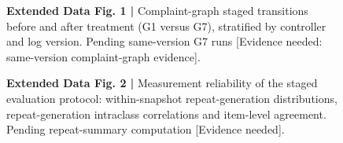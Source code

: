 \documentclass[sn-nature,pdflatex]{sn-jnl}
\begin{document}

\begin{figure}[h]
\centering
{}
\par\smallskip
\parbox{0.9\textwidth}{\footnotesize\textbf{Extended Data Fig. 1 |} Complaint-graph staged transitions before and after treatment (G1 versus G7), stratified by controller and log version. Pending same-version G7 runs [Evidence needed: same-version complaint-graph evidence].}
\end{figure}

\begin{figure}[h]
\centering
{}
\par\smallskip
\parbox{0.9\textwidth}{\footnotesize\textbf{Extended Data Fig. 2 |} Measurement reliability of the staged evaluation protocol: within-snapshot repeat-generation distributions, repeat-generation intraclass correlations and item-level agreement. Pending repeat-summary computation [Evidence needed].}
\end{figure}
\end{document}
